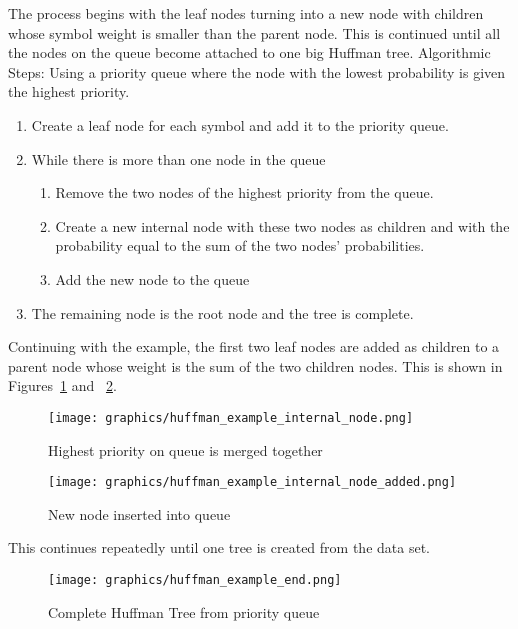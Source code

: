 \documentclass[letterpaper, 12pt]{article}
\begin{document}
The process begins with the leaf nodes turning into a new node with children whose symbol weight is smaller than
the parent node. This is continued until all the nodes on the queue become attached to one big Huffman tree.
Algorithmic Steps:
Using a priority queue where the node with the lowest probability is given the highest priority.
\begin{enumerate}
 \item Create a leaf node for each symbol and add it to the priority queue.
 \item While there is more than one node in the queue
 \begin{enumerate}
    \item Remove the two nodes of the highest priority from the queue.
    \item Create a new internal node with these two nodes as children and with the probability equal to
	  the sum of the two nodes' probabilities.
    \item Add the new node to the queue
  \end{enumerate}
  \item The remaining node is the root node and the tree is complete.
\end{enumerate}

Continuing with the example, the first two leaf nodes are added as children to a parent node whose
weight is the sum of the two children nodes. This is shown in Figures~\ref{fig:huffman_ex_int_1} and
~\ref{fig:huffman_ex_int_2}.
\par\vspace{\baselineskip}

\begin{figure}
  \centering
  \texttt{[image: graphics/huffman\_example\_internal\_node.png]}
  \cite{huffman}
  \caption{Highest priority on queue is merged together}
  \label{fig:huffman_ex_int_1}
\end{figure}

\begin{figure}
  \centering
  \texttt{[image: graphics/huffman\_example\_internal\_node\_added.png]}
  \cite{huffman}
  \caption{New node inserted into queue}
  \label{fig:huffman_ex_int_2}
\end{figure}

This continues repeatedly until one tree is created from the data set.
\par\vspace{\baselineskip}

\begin{figure}
  \centering
  \texttt{[image: graphics/huffman\_example\_end.png]}
  \cite{huffman}
  \caption{Complete Huffman Tree from priority queue}
\end{figure}
\end{document}
